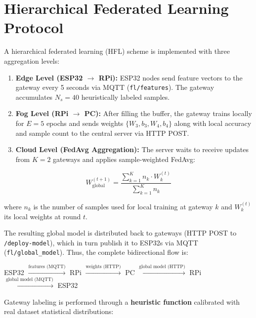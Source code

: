 \section{Hierarchical Federated Learning Protocol}
\label{sec:fedavg}

A hierarchical federated learning (HFL) scheme is implemented with three aggregation levels:

\begin{enumerate}
    \item \textbf{Edge Level (ESP32 $\to$ RPi):} ESP32 nodes send feature vectors to the gateway every 5 seconds via MQTT (\texttt{fl/features}). The gateway accumulates $N_s = 40$ heuristically labeled samples.

    \item \textbf{Fog Level (RPi $\to$ PC):} After filling the buffer, the gateway trains locally for $E = 5$ epochs and sends weights $\{W_3, b_3, W_4, b_4\}$ along with local accuracy and sample count to the central server via HTTP POST.

    \item \textbf{Cloud Level (FedAvg Aggregation):} The server waits to receive updates from $K = 2$ gateways and applies sample-weighted FedAvg:
\end{enumerate}

\begin{equation}
W_{\text{global}}^{(t+1)} = \frac{\sum_{k=1}^{K} n_k \cdot W_k^{(t)}}{\sum_{k=1}^{K} n_k}
\label{eq:fedavg}
\end{equation}

where $n_k$ is the number of samples used for local training at gateway $k$ and $W_k^{(t)}$ its local weights at round $t$.

The resulting global model is distributed back to gateways (HTTP POST to \texttt{/deploy-model}), which in turn publish it to ESP32s via MQTT (\texttt{fl/global\_model}). Thus, the complete bidirectional flow is:

\begin{center}
ESP32 $\xrightarrow{\text{features (MQTT)}}$ RPi $\xrightarrow{\text{weights (HTTP)}}$ PC $\xrightarrow{\text{global model (HTTP)}}$ RPi $\xrightarrow{\text{global model (MQTT)}}$ ESP32
\end{center}

Gateway labeling is performed through a \textbf{heuristic function} calibrated with real dataset statistical distributions:

